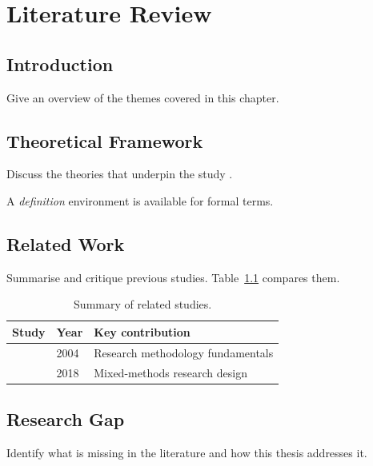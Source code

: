 \chapter{Literature Review}
\label{chap:literature}

\section{Introduction}
Give an overview of the themes covered in this chapter.

\section{Theoretical Framework}
Discuss the theories that underpin the study \parencite{creswell2018}.

\begin{definition}
A \emph{definition} environment is available for formal terms.
\end{definition}

\section{Related Work}
Summarise and critique previous studies. Table~\ref{tab:related} compares them.

\begin{table}[H]
    \centering
    \caption{Summary of related studies.}
    \label{tab:related}
    \begin{tabular}{llp{6cm}}
        \toprule
        Study & Year & Key contribution \\
        \midrule
        \textcite{kothari2004} & 2004 & Research methodology fundamentals \\
        \textcite{creswell2018} & 2018 & Mixed-methods research design \\
        \bottomrule
    \end{tabular}
\end{table}

\section{Research Gap}
Identify what is missing in the literature and how this thesis addresses it.
